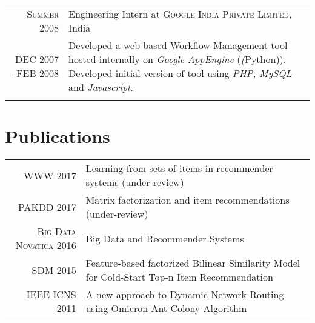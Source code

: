 \documentclass[a4paper,10pt]{article}
\begin{document}
\begin{tabular}{r|p{11cm}}

  \textsc{Summer 2008} & Engineering Intern at \textsc{Google India Private
             Limited}, India \\
             DEC 2007 - FEB 2008  &\footnotesize{ Developed a web-based Workflow Management
           tool hosted internally on \emph{Google AppEngine} (\emph(Python)).
       Developed initial version of tool using \emph{PHP, MySQL} and \emph{
     Javascript}.} \\\multicolumn{2}{c}{} \\
  
\end{tabular}

\section{Publications}
\begin{tabular}{rp{11cm}}
  \textsc{WWW} 2017 & Learning from sets of items in recommender systems
  (under-review)\\
  \textsc{PAKDD} 2017 & Matrix factorization and item recommendations
  (under-review)\\
  \textsc{Big Data Novatica} 2016 & Big Data and Recommender Systems \\
 \textsc{SDM} 2015 & Feature-based factorized Bilinear Similarity Model for
  Cold-Start Top-n Item Recommendation
  \\
 \textsc{IEEE ICNS} 2011 & A new approach to Dynamic Network Routing using Omicron
  Ant Colony Algorithm\\
\end{tabular}
\end{document}
